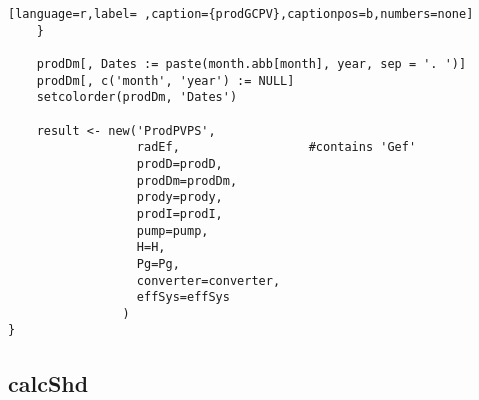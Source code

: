 \begin{lstlisting}[language=r,label= ,caption={prodGCPV},captionpos=b,numbers=none]
    }

    prodDm[, Dates := paste(month.abb[month], year, sep = '. ')]
    prodDm[, c('month', 'year') := NULL]
    setcolorder(prodDm, 'Dates')

    result <- new('ProdPVPS',
                  radEf,                  #contains 'Gef'
                  prodD=prodD,
                  prodDm=prodDm,
                  prody=prody,
                  prodI=prodI,
                  pump=pump,
                  H=H,
                  Pg=Pg,
                  converter=converter,
                  effSys=effSys
                )
}
\end{lstlisting}
\subsection{calcShd}
\label{sec:org8a3cb84}
\label{subsec:calcShd}
